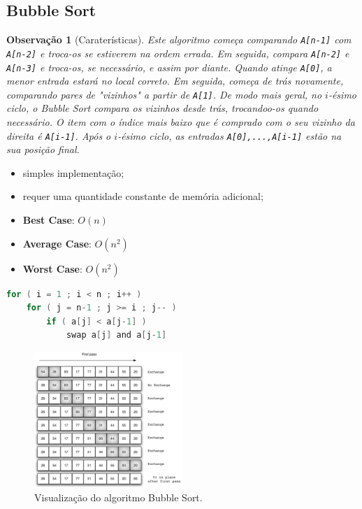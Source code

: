 \documentclass[a4paper, 12pt]{article}
\newtheorem{remark}{Observação}
\begin{document}
\subsection{Bubble Sort}
\begin{remark}[Caraterísticas]
    Este algoritmo começa comparando \texttt{A[n-1]} com \texttt{A[n-2]} e troca-os se estiverem na ordem errada. Em seguida, compara \texttt{A[n-2]} e \texttt{A[n-3]} e troca-os, se necessário, e assim por diante. Quando atinge \texttt{A[0]}, a menor entrada estará no local correto. Em seguida, começa de trás novamente, comparando pares de "vizinhos" a partir de \texttt{A[1]}. De modo mais geral, no $i$-ésimo ciclo, o Bubble Sort compara os vizinhos desde trás, trocandoo-os quando necessário. O item com o índice mais baixo que é comprado com o seu vizinho da direita é \texttt{A[i-1]}. Após o $i$-ésimo ciclo, as entradas \texttt{A[0],...,A[i-1]} estão na sua posição final.\end{remark}
    \begin{itemize}
        \item simples implementação;
        \item requer uma quantidade constante de memória adicional;
        \item \textbf{Best Case}: $O(n)$
        \item \textbf{Average Case}: $O(n^2)$
        \item \textbf{Worst Case}: $O(n^2)$
    \end{itemize}


\begin{center}
    \begin{lstlisting}[frame=single, language=c, caption=Algoritmo Bubble Sort, captionpos=b]
for ( i = 1 ; i < n ; i++ )
    for ( j = n-1 ; j >= i ; j-- )
        if ( a[j] < a[j-1] )
            swap a[j] and a[j-1]
    \end{lstlisting}
    
    \begin{figure}[H]
        \centering
        \includegraphics[width=0.5\textwidth]{fig/ao/bs.png}
        \caption{Visualização do algoritmo Bubble Sort.}
    \end{figure}
\end{center}
\end{document}
